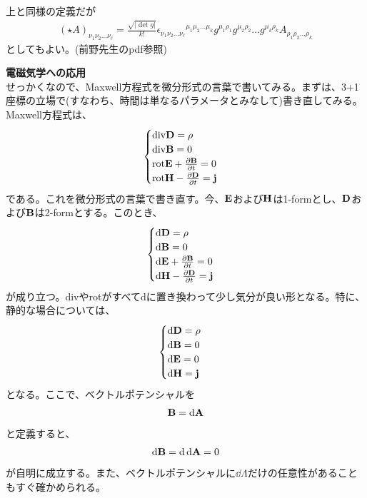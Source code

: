 \documentclass[a4paper,11pt]{jsarticle}
\numberwithin{equation}{section}
\begin{document}
上と同様の定義だが
\begin{align}
  (\star A)_{\nu_1 \nu_2 \dots \nu_\ell} 
  = \frac{\sqrt{|\det g|}}{k!} \epsilon_{\nu_1 \nu_2 \dots \nu_\ell}{}^{\mu_1 \mu_2 \dots \mu_k}
  g^{\mu_1 \rho_1} g^{\mu_2 \rho_2} \dots g^{\mu_k \rho_k} 
  A_{\rho_1 \rho_2 \dots \rho_k}
\end{align}
としてもよい。(前野先生のpdf参照)

\textbf{電磁気学への応用}\\
せっかくなので、Maxwell方程式を微分形式の言葉で書いてみる。まずは、3+1座標の立場で(すなわち、時間は単なるパラメータとみなして)書き直してみる。Maxwell方程式は、
\begin{align}
  \begin{cases}
    \text{div} \vb{D} = \rho\\
    \text{div} \vb{B} = 0\\
    \text{rot} \vb{E} + \pdv{\vb{B}}{t} = 0\\
    \text{rot} \vb{H} - \pdv{\vb{D}}{t} = \vb{j}
  \end{cases}
\end{align}
である。これを微分形式の言葉で書き直す。今、$\vb{E}$および$\vb{H}$は1-formとし、$\vb{D}$および$\vb{B}$は2-formとする。このとき、
\begin{align}
  \begin{cases}
    \dd \vb{D} = \rho\\
    \dd \vb{B} = 0\\
    \dd \vb{E} + \pdv{\vb{B}}{t} = 0\\
    \dd \vb{H} - \pdv{\vb{D}}{t} = \vb{j}
  \end{cases}
\end{align}
が成り立つ。divやrotがすべてdに置き換わって少し気分が良い形となる。特に、静的な場合については、
\begin{align}
  \begin{cases}
    \dd \vb{D} = \rho\\
    \dd \vb{B} = 0\\
    \dd \vb{E} = 0\\
    \dd \vb{H} = \vb{j}
  \end{cases}
\end{align}
となる。ここで、ベクトルポテンシャルを
\begin{align}
  \vb{B} = \dd{\vb{A}}
\end{align}
と定義すると、
\begin{align}
  \dd \vb{B} = \dd \dd{\vb{A}} = 0
\end{align}
が自明に成立する。また、ベクトルポテンシャルに$\dd{\Lambda}$だけの任意性があることもすぐ確かめられる。\\
\end{document}
